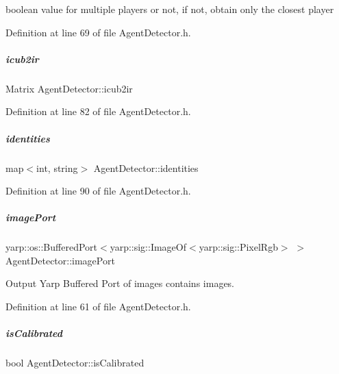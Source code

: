 boolean value for multiple players or not, if not, obtain only the closest player 



Definition at line 69 of file Agent\+Detector.\+h.

\mbox{\label{group__agentDetector_a9f319fe7d3efdaa95b90509ca177dd51}} 
\subparagraph{\texorpdfstring{icub2ir}{icub2ir}}
{\footnotesize\ttfamily Matrix Agent\+Detector\+::icub2ir\hspace{0.3cm}{\ttfamily [protected]}}



Definition at line 82 of file Agent\+Detector.\+h.

\mbox{\label{group__agentDetector_afbbfd1710693aad1f25ee1e01af512ea}} 
\subparagraph{\texorpdfstring{identities}{identities}}
{\footnotesize\ttfamily map$<$int, string$>$ Agent\+Detector\+::identities\hspace{0.3cm}{\ttfamily [protected]}}



Definition at line 90 of file Agent\+Detector.\+h.

\mbox{\label{group__agentDetector_a10140a4002c6bb0c2e7cc5e762d4ad6c}} 
\subparagraph{\texorpdfstring{image\+Port}{imagePort}}
{\footnotesize\ttfamily yarp\+::os\+::\+Buffered\+Port$<$yarp\+::sig\+::\+Image\+Of$<$yarp\+::sig\+::\+Pixel\+Rgb$>$ $>$ Agent\+Detector\+::image\+Port\hspace{0.3cm}{\ttfamily [protected]}}



Output Yarp Buffered Port of images contains images. 



Definition at line 61 of file Agent\+Detector.\+h.

\mbox{\label{group__agentDetector_a901883d999711b6632f0ecc5114ea0ca}} 
\subparagraph{\texorpdfstring{is\+Calibrated}{isCalibrated}}
{\footnotesize\ttfamily bool Agent\+Detector\+::is\+Calibrated\hspace{0.3cm}{\ttfamily [protected]}}



